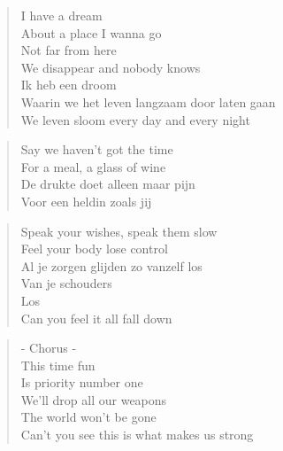 

\begin{minipage}{0.65\textwidth}
\begin{verse}
I have a dream  \\
About a place I wanna go \\
Not far from here \\
We disappear and nobody knows \\
Ik heb een droom  \\
Waarin we het leven langzaam door laten gaan \\
We leven sloom every day and every night 
\end{verse}

\begin{verse}
Say we haven’t got the time \\
For a meal, a glass of wine \\
De drukte doet alleen maar pijn \\
Voor een heldin zoals jij
\end{verse}

\begin{verse}
Speak your wishes, speak them slow \\
Feel your body lose control \\
Al je zorgen glijden zo vanzelf los \\
Van je schouders \\
Los \\
Can you feel it all fall down
\end{verse}

\begin{verse}
- Chorus - \\
This time fun \\
Is priority number one \\
We’ll drop all our weapons \\
The world won’t be gone \\
Can’t you see this is what makes us strong
\end{verse}
\end{minipage}
